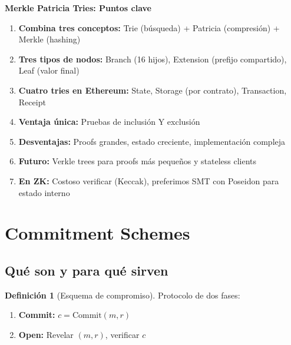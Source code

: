 \documentclass[11pt,a4paper,twoside,openright]{book}
\theoremstyle{definition}
\newtheorem{definition}{Definición}[chapter]
\theoremstyle{plain}
\theoremstyle{remark}
\begin{document}
\begin{keyidea}
\textbf{Merkle Patricia Tries: Puntos clave}

\begin{enumerate}
    \item \textbf{Combina tres conceptos:} Trie (búsqueda) + Patricia (compresión) + Merkle (hashing)
    
    \item \textbf{Tres tipos de nodos:} Branch (16 hijos), Extension (prefijo compartido), Leaf (valor final)
    
    \item \textbf{Cuatro tries en Ethereum:} State, Storage (por contrato), Transaction, Receipt
    
    \item \textbf{Ventaja única:} Pruebas de inclusión Y exclusión
    
    \item \textbf{Desventajas:} Proofs grandes, estado creciente, implementación compleja
    
    \item \textbf{Futuro:} Verkle trees para proofs más pequeños y stateless clients
    
    \item \textbf{En ZK:} Costoso verificar (Keccak), preferimos SMT con Poseidon para estado interno
\end{enumerate}
\end{keyidea}


\section{Commitment Schemes}

\subsection{Qué son y para qué sirven}

\begin{definition}[Esquema de compromiso]
Protocolo de dos fases:
\begin{enumerate}
    \item \textbf{Commit:} $c = \text{Commit}(m, r)$
    \item \textbf{Open:} Revelar $(m, r)$, verificar $c$
\end{enumerate}
\end{definition}
\end{document}
